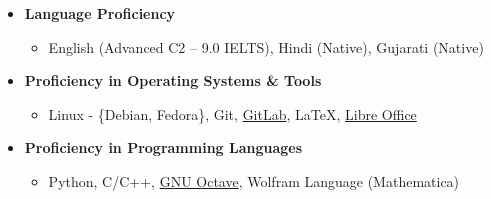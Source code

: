 \noindent\makebox[\linewidth]{\rule{\linewidth}{1.1pt}}
\vspace{-0.5cm}
\begin{itemize}
	\item \textbf{Language Proficiency} 
	\begin{itemize} %
		\item English (Advanced C2 – 9.0 IELTS), Hindi (Native), Gujarati (Native)
	\end{itemize}
	\item \textbf{Proficiency in Operating Systems \& Tools}
	\begin{itemize} %
		\item Linux - \{Debian, Fedora\}, Git, \href{https://gitlab.com/}{GitLab}, \LaTeX, \href{https://www.libreoffice.org/}{Libre Office}
	\end{itemize}
	\item \textbf{Proficiency in Programming Languages}			
	\begin{itemize} %
		\item Python, C/C++, \href{https://octave.org/}{GNU Octave}, Wolfram Language (Mathematica)
	\end{itemize}
	
\end{itemize}